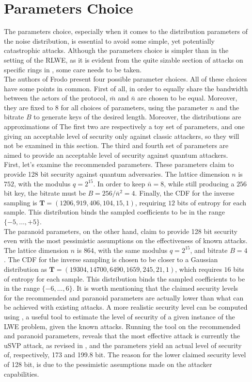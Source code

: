 \section{Parameters Choice}
The parameters choice, especially when it comes to the distribution parameters of the noise distribution, is essential to avoid some simple, yet potentially catastrophic attacks. Although the parameters choice is simpler than in the setting of the RLWE, as it is evident from the quite sizable section of attacks on specific rings in \cite{RLWE_attacks}, some care needs to be taken.\\
The authors of Frodo present four possible parameter choices. All of these choices have some points in common. First of all, in order to equally share the bandwidth between the actors of the protocol, $\bar{m}$ and $\bar{n}$ are chosen to be equal. Moreover, they are fixed to $8$ for all choices of parameters, using the parameter $n$ and the bitrate $B$ to generate keys of the desired length. Moreover, the distributions are approximations of 
The first two are respectively a toy set of parameters, and one giving an acceptable level of security only against classic attackers, so they will not be examined in this section. The third and fourth set of parameters are aimed to provide an acceptable level of security against quantum attackers.\\
First, let's examine the recommended parameters. These parameters claim to provide 128 bit  security against quantum adversaries. The lattice dimension $n$ is $752$, with the modulus $q=2^{15}$. In order to keep $\bar{n}=8$, while still producing a $256$ bit key, the bitrate must be $B=256/\bar{n}^2=4$. Finally, the CDF for the inverse sampling is $\mathbf{T}=(1206, 919, 406, 104, 15, 1)$, requiring $12$ bits of entropy for each sample. This distribution binds the sampled coefficients to be in the range $\{-5,\ldots,+5\}$.\\
The paranoid parameters, on the other hand, claim to provide 128 bit security even with the most pessimistic assumptions on the effectiveness of known attacks. The lattice dimension $n$ is $864$, with the same modulus $q=2^{15}$, and bitrate $B=4$. The CDF for the inverse sampling is chosen to be closer to a Gaussian distribution as $\mathbf{T}=(19304, 14700, 6490, 1659, 245, 21, 1)$, which requires $16$ bits of entropy for each sample. This distribution binds the sampled coefficients to be in the range $\{-6,\ldots,6\}$.
It is worth mentioning that the claimed security levels for the recommended and paranoid parameters are actually lower than what can be achieved with existing attacks. A more realistic security level can be computed using \cite{parameters}, a useful tool to estimate the level of security of a given instance of the LWE problem, given the known attacks. Running the tool on the recommended and paranoid parameters, reveals that the most effective attack is currently the uSVP attack, as revised in \cite{RUSVP}, and the parameters yield an actual level of security of, respectively, 173 and 199.8 bit. The reason for the lower claimed security level of 128 bit, is due to the pessimistic assumptions made on the attacker capabilities.

